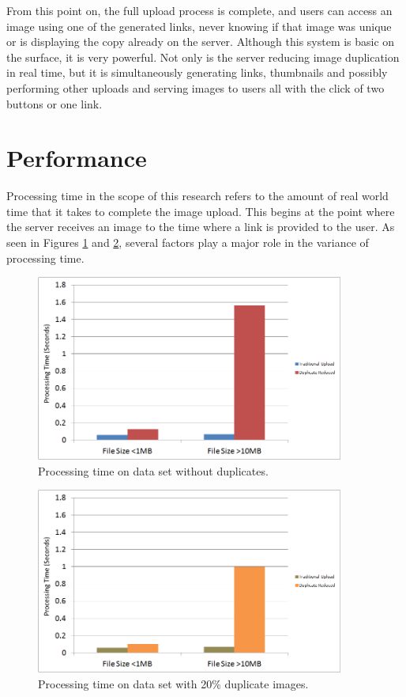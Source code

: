 From this point on, the full upload process is complete, and users can access an image using one of the generated links, never knowing if that image was unique or is displaying the copy already on the server. Although this system is basic on the surface, it is very powerful. Not only is the server reducing image duplication in real time, but it is simultaneously generating links, thumbnails and possibly performing other uploads and serving images to users all with the click of two buttons or one link.

\section{Performance}
Processing time in the scope of this research refers to the amount of real world time that it takes to complete the image upload. This begins at the point where the server receives an image to the time where a link is provided to the user. As seen in Figures \ref{fig:proctimenodup} and \ref{fig:proctimemixdup}, several factors play a major role in the variance of processing time.

\begin{figure}[htbp]
\centering
\includegraphics[width=4in]{proctimenodup}
\caption{Processing time on data set without duplicates.}
\label{fig:proctimenodup}
\end{figure}

\begin{figure}[htbp]
\centering
\includegraphics[width=4in]{proctimemixdup}
\caption{Processing time on data set with 20\% duplicate images.}
\label{fig:proctimemixdup}
\end{figure}

